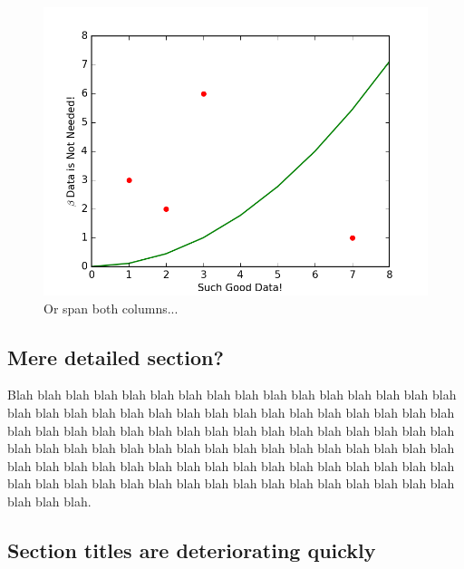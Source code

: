 \documentclass[twocolumn]{aastex61}
\begin{document}




	\begin{figure}[t]
	\centerline{\includegraphics[width=\textwidth, trim=0in 0in 0in 0in, clip=true]{figure_1.png}}
	\caption{Or span both columns...}
	\label{fig:figure2}
	\end{figure}


\subsection{Mere detailed section?}

Blah blah blah blah blah blah blah blah blah blah blah blah blah blah blah blah blah blah blah blah blah blah blah blah blah blah blah blah blah blah blah blah blah blah blah blah blah blah blah blah blah blah blah blah blah blah blah blah blah blah blah blah blah blah blah blah blah blah blah blah blah blah blah blah blah blah blah blah blah blah blah blah blah blah blah blah blah blah blah blah blah blah blah blah blah blah blah blah blah blah blah blah blah blah blah blah blah blah blah.


\subsection{Section titles are deteriorating quickly}
\end{document}

